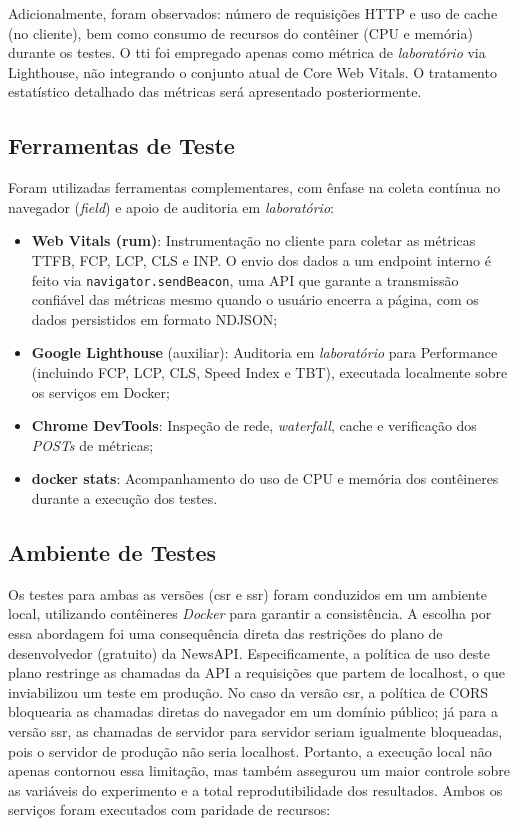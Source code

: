 Adicionalmente, foram observados: número de requisições HTTP e uso de cache (no cliente), bem como consumo de recursos do contêiner (CPU e memória) durante os testes. O \acrfull{tti} foi empregado apenas como métrica de \textit{laboratório} via Lighthouse, não integrando o conjunto atual de Core Web Vitals. O tratamento estatístico detalhado das métricas será apresentado posteriormente.

\subsection{Ferramentas de Teste}

Foram utilizadas ferramentas complementares, com ênfase na coleta contínua no navegador (\textit{field}) e apoio de auditoria em \textit{laboratório}:

\begin{itemize}
    \item \textbf{Web Vitals (\acrfull{rum})}: Instrumentação no cliente para coletar as métricas TTFB, FCP, LCP, CLS e INP. O envio dos dados a um endpoint interno é feito via \texttt{navigator.sendBeacon}, uma API que garante a transmissão confiável das métricas mesmo quando o usuário encerra a página, com os dados persistidos em formato NDJSON;

    \item \textbf{Google Lighthouse} (auxiliar): Auditoria em \textit{laboratório} para Performance (incluindo FCP, LCP, CLS, Speed Index e TBT), executada localmente sobre os serviços em Docker;
    \item \textbf{Chrome DevTools}: Inspeção de rede, \textit{waterfall}, cache e verificação dos \textit{POSTs} de métricas;
    \item \textbf{docker stats}: Acompanhamento do uso de CPU e memória dos contêineres durante a execução dos testes.
\end{itemize}

\subsection{Ambiente de Testes}


Os testes para ambas as versões (\acrshort{csr} e \acrshort{ssr}) foram conduzidos em um ambiente local, utilizando contêineres \textit{Docker} para garantir a consistência. A escolha por essa abordagem foi uma consequência direta das restrições do plano de desenvolvedor (gratuito) da NewsAPI. Especificamente, a política de uso deste plano restringe as chamadas da API a requisições que partem de localhost, o que inviabilizou um teste em produção. No caso da versão \acrshort{csr}, a política de CORS bloquearia as chamadas diretas do navegador em um domínio público; já para a versão \acrshort{ssr}, as chamadas de servidor para servidor seriam igualmente bloqueadas, pois o servidor de produção não seria localhost. Portanto, a execução local não apenas contornou essa limitação, mas também assegurou um maior controle sobre as variáveis do experimento e a total reprodutibilidade dos resultados. Ambos os serviços foram executados com paridade de recursos:

